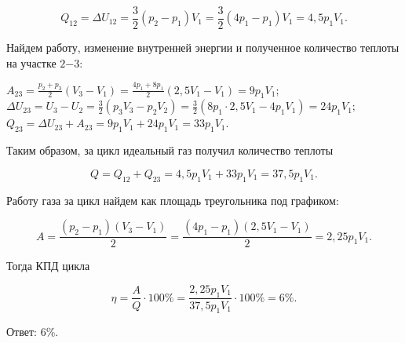 \documentclass[12pt,a4paper]{article}
\begin{document}
{\[Q_{12}=\Delta U_{12}= \frac{3}{2} ( p_2 - p_1 ) V_1= \frac{3}{2} ( 4p_1 - p_1 ) V_1=4{,}5p_1V_1.\]

Найдем работу, изменение внутренней энергии и полученное количество теплоты на участке $2$−$3$:

$A_{23}= \frac{p_2 + p_3}{2} ( V_3 - V_1 ) = \frac{4p_1 + 8p_1}{2} ( 2{,}5V_1 - V_1 ) =9p_1V_1;$
$\Delta U_{23}=U_3 - U_2= \frac{3}{2} ( p_3V_3 - p_2V_2 ) = \frac{3}{2} ( 8p_1 \cdot 2{,}5V_1 - 4p_1V_1 ) =24p_1V_1;$
$Q_{23}=\Delta U_{23} + A_{23}=9p_1V_1 + 24p_1V_1=33p_1V_1.$

Таким образом, за цикл идеальный газ получил количество теплоты

\[Q=Q_{12} + Q_{23}=4{,}5p_1V_1 + 33p_1V_1=37{,}5p_1V_1.\]

Работу газа за цикл найдем как площадь треугольника под графиком:

\[A= \frac{( p_2 - p_1 ) ( V_3 - V_1 )}{2} = \frac{( 4p_1 - p_1 ) ( 2{,}5V_1 - V_1 )}{2} =2{,}25p_1V_1.\]

Тогда КПД цикла

\[\eta= \frac{A}{Q} \cdot 100\%= \frac{2{,}25p_1V_1}{37{,}5p_1V_1} \cdot 100\% = 6\%.\]

Ответ: $6$\%.
}
\end{document}

